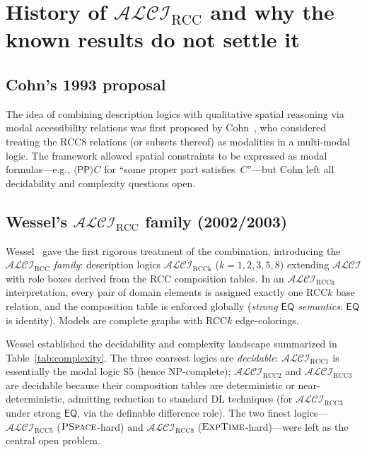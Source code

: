 \documentclass[11pt]{article}
\newcommand{\ALCIRCC}[1]{\mathcal{ALCI}_{\mathrm{RCC#1}}}
\newcommand{\PP}{\mathsf{PP}}
\newcommand{\EQ}{\mathsf{EQ}}
\newcommand{\EXPTIME}{\textsc{ExpTime}}
\newcommand{\PSPACE}{\textsc{PSpace}}
\newcommand{\ALCI}{\ensuremath{\mathcal{ALCI}}}
\theoremstyle{plain}
\theoremstyle{definition}
\begin{document}
\section{History of $\ALCIRCC{}$ and why the known results do not settle it}
\label{sec:history}

\subsection{Cohn's 1993 proposal}

The idea of combining description logics with qualitative spatial
reasoning via modal accessibility relations was first proposed by
Cohn~\cite{Cohn1993}, who considered treating the RCC8 relations
(or subsets thereof) as modalities in a multi-modal logic.
The framework allowed spatial constraints to be expressed as
modal formulas---e.g., $\langle \PP \rangle C$ for ``some proper
part satisfies~$C$''---but Cohn left all decidability and complexity
questions open.

\subsection{Wessel's $\ALCIRCC{}$ family (2002/2003)}

Wessel~\cite{Wessel2002,Wessel2003,Wessel2001} gave the first rigorous treatment
of the combination, introducing the \emph{$\ALCIRCC{}$ family}:
description logics $\ALCIRCC{k}$ ($k = 1,2,3,5,8$) extending $\ALCI$
with role boxes derived from the RCC composition tables.
In an $\ALCIRCC{k}$ interpretation, every pair of domain elements is
assigned exactly one RCC$k$ base relation, and the composition table
is enforced globally (\emph{strong $\EQ$ semantics}: $\EQ$ is identity).
Models are complete graphs with RCC$k$ edge-colorings.

Wessel established the decidability and complexity landscape summarized in
Table~\ref{tab:complexity}. The three coarsest logics are \emph{decidable}:
$\ALCIRCC1$ is essentially the modal logic S5 (hence \textsc{NP}-complete);
$\ALCIRCC2$ and $\ALCIRCC3$ are decidable because their composition tables
are deterministic or near-deterministic, admitting reduction to standard DL
techniques (for $\ALCIRCC3$ under strong $\EQ$, via the definable
difference role). The two finest logics---$\ALCIRCC5$ ($\PSPACE$-hard) and
$\ALCIRCC8$ ($\EXPTIME$-hard)---were left as the central open problem.
\end{document}
